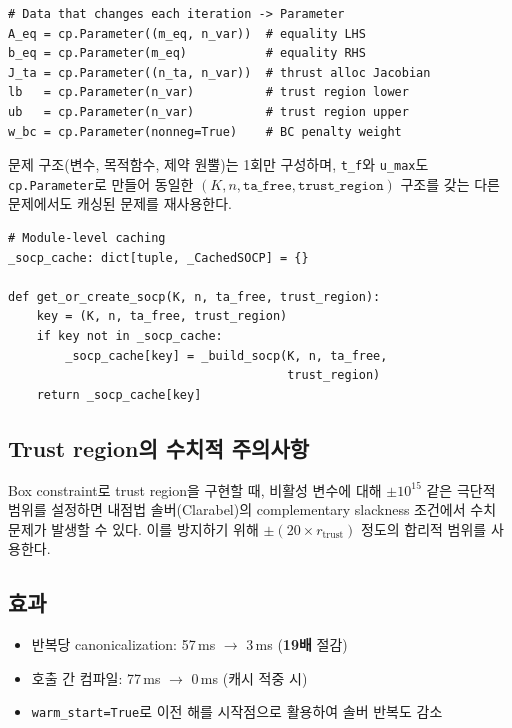\documentclass[11pt]{article}
\begin{document}
\begin{lstlisting}[style=pythonstyle]
# Data that changes each iteration -> Parameter
A_eq = cp.Parameter((m_eq, n_var))  # equality LHS
b_eq = cp.Parameter(m_eq)           # equality RHS
J_ta = cp.Parameter((n_ta, n_var))  # thrust alloc Jacobian
lb   = cp.Parameter(n_var)          # trust region lower
ub   = cp.Parameter(n_var)          # trust region upper
w_bc = cp.Parameter(nonneg=True)    # BC penalty weight
\end{lstlisting}

문제 구조(변수, 목적함수, 제약 원뿔)는 1회만 구성하며,
\texttt{t\_f}와 \texttt{u\_max}도 \texttt{cp.Parameter}로 만들어
동일한 $(K, n, \texttt{ta\_free}, \texttt{trust\_region})$ 구조를 갖는
다른 문제에서도 캐싱된 문제를 재사용한다.

\begin{lstlisting}[style=pythonstyle]
# Module-level caching
_socp_cache: dict[tuple, _CachedSOCP] = {}

def get_or_create_socp(K, n, ta_free, trust_region):
    key = (K, n, ta_free, trust_region)
    if key not in _socp_cache:
        _socp_cache[key] = _build_socp(K, n, ta_free,
                                       trust_region)
    return _socp_cache[key]
\end{lstlisting}

\subsection{Trust region의 수치적 주의사항}

Box constraint로 trust region을 구현할 때,
비활성 변수에 대해 $\pm 10^{15}$ 같은 극단적 범위를 설정하면
내점법 솔버(Clarabel)의 complementary slackness 조건에서
수치 문제가 발생할 수 있다.
이를 방지하기 위해 $\pm (20 \times r_{\mathrm{trust}})$ 정도의
합리적 범위를 사용한다.

\subsection{효과}

\begin{itemize}
  \item 반복당 canonicalization: 57\,ms $\to$ 3\,ms (\textbf{19배} 절감)
  \item 호출 간 컴파일: 77\,ms $\to$ 0\,ms (캐시 적중 시)
  \item \texttt{warm\_start=True}로 이전 해를 시작점으로 활용하여
        솔버 반복도 감소
\end{itemize}
\end{document}
